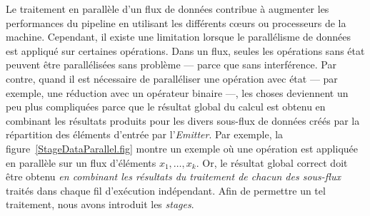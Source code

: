 Le traitement en parall\`ele d'un flux de donn\'ees contribue \`a augmenter les performances du pipeline en utilisant les diff\'erents cœurs ou processeurs de la machine. Cependant, il existe une limitation lorsque le parall\'elisme de donn\'ees est appliqu\'e sur certaines op\'erations. Dans un flux, seules les op\'erations sans \'etat peuvent \^etre parall\'elis\'ees sans probl\`eme --- parce que sans interf\'erence. Par contre, quand il est n\'ecessaire de parall\'eliser une op\'eration avec \'etat --- par exemple, une r\'eduction avec un op\'erateur binaire ---, les choses deviennent un peu plus compliqu\'ees parce que le r\'esultat global du calcul est obtenu en combinant les r\'esultats produits pour les divers sous-flux de donn\'ees cr\'e\'es par la r\'epartition des \'el\'ements d'entr\'ee par l'\emph{Emitter}. Par exemple, la figure~\ref{StageDataParallel.fig} montre un exemple o\`u une op\'eration  est appliqu\'ee en parall\`ele sur un flux d'\'el\'ements $x_1, \ldots, x_k$. Or, le r\'esultat global correct doit \^etre obtenu \emph{en combinant les r\'esultats du traitement de chacun des sous-flux} trait\'es dans chaque fil d'ex\'ecution ind\'ependant. Afin de permettre un tel traitement, nous avons introduit les \emph{stages}.




